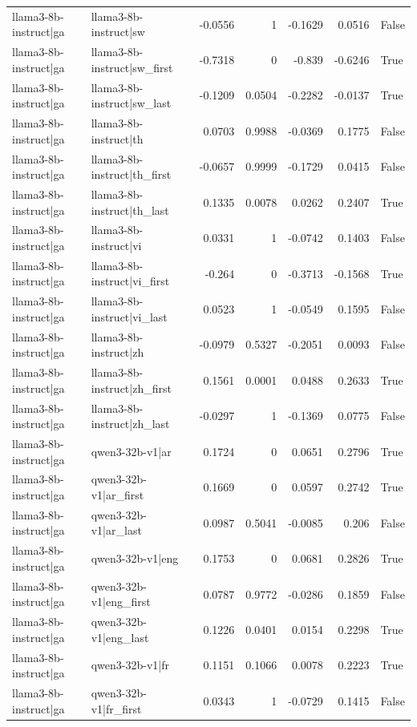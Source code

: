 \begin{table}
\begin{tabular}{l l r r r r l}
llama3-8b-instruct|ga & llama3-8b-instruct|sw & -0.0556 & 1 & -0.1629 & 0.0516 & False \\
llama3-8b-instruct|ga & llama3-8b-instruct|sw_first & -0.7318 & 0 & -0.839 & -0.6246 & True \\
llama3-8b-instruct|ga & llama3-8b-instruct|sw_last & -0.1209 & 0.0504 & -0.2282 & -0.0137 & True \\
llama3-8b-instruct|ga & llama3-8b-instruct|th & 0.0703 & 0.9988 & -0.0369 & 0.1775 & False \\
llama3-8b-instruct|ga & llama3-8b-instruct|th_first & -0.0657 & 0.9999 & -0.1729 & 0.0415 & False \\
llama3-8b-instruct|ga & llama3-8b-instruct|th_last & 0.1335 & 0.0078 & 0.0262 & 0.2407 & True \\
llama3-8b-instruct|ga & llama3-8b-instruct|vi & 0.0331 & 1 & -0.0742 & 0.1403 & False \\
llama3-8b-instruct|ga & llama3-8b-instruct|vi_first & -0.264 & 0 & -0.3713 & -0.1568 & True \\
llama3-8b-instruct|ga & llama3-8b-instruct|vi_last & 0.0523 & 1 & -0.0549 & 0.1595 & False \\
llama3-8b-instruct|ga & llama3-8b-instruct|zh & -0.0979 & 0.5327 & -0.2051 & 0.0093 & False \\
llama3-8b-instruct|ga & llama3-8b-instruct|zh_first & 0.1561 & 0.0001 & 0.0488 & 0.2633 & True \\
llama3-8b-instruct|ga & llama3-8b-instruct|zh_last & -0.0297 & 1 & -0.1369 & 0.0775 & False \\
llama3-8b-instruct|ga & qwen3-32b-v1|ar & 0.1724 & 0 & 0.0651 & 0.2796 & True \\
llama3-8b-instruct|ga & qwen3-32b-v1|ar_first & 0.1669 & 0 & 0.0597 & 0.2742 & True \\
llama3-8b-instruct|ga & qwen3-32b-v1|ar_last & 0.0987 & 0.5041 & -0.0085 & 0.206 & False \\
llama3-8b-instruct|ga & qwen3-32b-v1|eng & 0.1753 & 0 & 0.0681 & 0.2826 & True \\
llama3-8b-instruct|ga & qwen3-32b-v1|eng_first & 0.0787 & 0.9772 & -0.0286 & 0.1859 & False \\
llama3-8b-instruct|ga & qwen3-32b-v1|eng_last & 0.1226 & 0.0401 & 0.0154 & 0.2298 & True \\
llama3-8b-instruct|ga & qwen3-32b-v1|fr & 0.1151 & 0.1066 & 0.0078 & 0.2223 & True \\
llama3-8b-instruct|ga & qwen3-32b-v1|fr_first & 0.0343 & 1 & -0.0729 & 0.1415 & False \\

\end{tabular}
\end{table}
